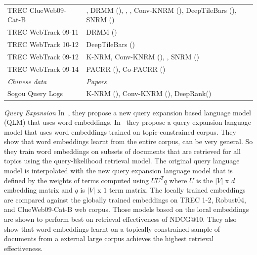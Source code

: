 {\begin{table}
\begin{tabular}{lL{25em}}
        TREC ClueWeb09-Cat-B & \cite{diaz16}, DRMM (\cite{Guo2016}), \cite{Nie_ictir18, Nie_sigir_2018}, \cite{Dehghani_sigir17, dehghani2018fidelityweighted}, Conv-KNRM (\cite{ConvKNRM18}), DeepTileBars (\cite{deeptilebars_2019}), SNRM (\cite{Zamani_neural_reranking_2018})\\
        
        TREC WebTrack 09-11 & DRMM (\cite{Guo2016})\\
        
        TREC WebTrack 10-12 & DeepTileBars (\cite{deeptilebars_2019})\\
        
        TREC WebTrack 09-12 & K-NRM, Conv-KNRM (\cite{ConvKNRM18}), \cite{dehghani2018fidelityweighted}, SNRM (\cite{Zamani_neural_reranking_2018})\\
        
        TREC WebTrack 09-14 & PACRR (\cite{pacrr17}), Co-PACRR (\cite{co_pacrr_wsdm18})\\
        
        \textit{Chinese data} & \textit{Papers}\\
        Sogou Query Logs & K-NRM (\cite{KNRM17}), Conv-KNRM (\cite{ConvKNRM18}), DeepRank(\cite{Pang_deeprank_2017})\\
    \bottomrule
    \end{tabular}
    \label{tab:related_work_datasets}
\end{table}
}

\textit{Query Expansion} In~\citep{diaz16, Zamani_16a}, they propose a new query expansion based language model (QLM) that uses word embeddings. In~\cite{diaz16} they propose a query expansion language model that uses word embeddings trained on topic-constrained corpus. They show that word embeddings learnt from the entire corpus, can be very general. So they train word embeddings on subsets of documents that are retrieved for all topics using the query-likelihood retrieval model. The original query language model is interpolated with the new query expansion language model that is defined by the weights of terms computed using $UU^Tq$ where $U$ is the $|V|$ x $d$ embedding matrix and $q$ is $|V|$ x $1$ term matrix. The locally trained embeddings are compared against the globally trained embeddings on TREC 1-2, Robust04, and ClueWeb09-Cat-B web corpus. Those models based on the local embeddings are shown to perform best on retrieval effectiveness of NDCG@10. They also show that word embeddings learnt on a topically-constrained sample of documents from a external large corpus achieves the highest retrieval effectiveness.

